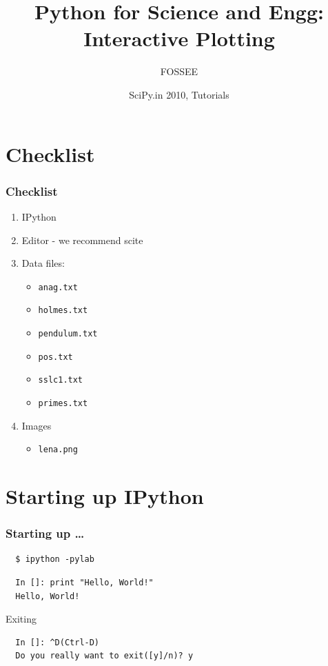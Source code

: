 \documentclass[14pt,compress]{beamer}
\title[Interactive Plotting]{Python for Science and Engg: Interactive Plotting}
\author[FOSSEE group] {FOSSEE}
\institute[IIT Bombay] {Department of Aerospace Engineering\\IIT Bombay}
\date[] {SciPy.in 2010, Tutorials}
\newcommand{\typ}[1]{\lstinline{#1}}
\begin{document}
\begin{frame}
  \maketitle
\end{frame}


\section{Checklist}
\begin{frame}
\frametitle{Checklist}
  \begin{enumerate}
    \item IPython
    \item Editor - we recommend \alert{scite}
    \item Data files: 
      \begin{itemize}
      \item \typ{anag.txt}
      \item \typ{holmes.txt}
      \item \typ{pendulum.txt}
      \item \typ{pos.txt}
      \item \typ{sslc1.txt}
      \item \typ{primes.txt}
      \end{itemize}
    \item Images
      \begin{itemize}
      \item \typ{lena.png}
      \end{itemize}
  \end{enumerate}
\end{frame}

\section{Starting up IPython}
\begin{frame}[fragile]
\frametitle{Starting up \ldots}
\begin{block}{}
\begin{lstlisting}
  $ ipython -pylab
\end{lstlisting} %
\end{block}
\begin{lstlisting}     
  In []: print "Hello, World!"
  Hello, World!
\end{lstlisting}
Exiting
\begin{lstlisting}
  In []: ^D(Ctrl-D)
  Do you really want to exit([y]/n)? y
\end{lstlisting}
\end{frame}
\end{document}

